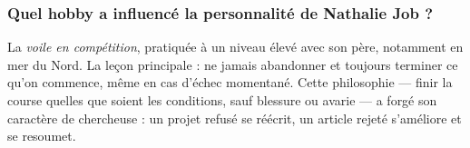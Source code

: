 \subsubsection{Quel hobby a influencé la personnalité de Nathalie Job ?}

La \textit{voile en compétition}, pratiquée à un niveau élevé avec son père, notamment en mer du Nord. La leçon principale : ne jamais abandonner et toujours terminer ce qu'on commence, même en cas d'échec momentané. Cette philosophie — finir la course quelles que soient les conditions, sauf blessure ou avarie — a forgé son caractère de chercheuse : un projet refusé se réécrit, un article rejeté s'améliore et se resoumet.
